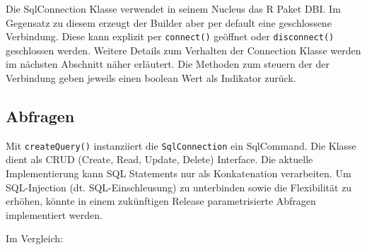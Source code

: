 \documentclass[]{article}
\newenvironment{Shaded}{\begin{snugshade}}{\end{snugshade}}
\newcommand{\CommentTok}[1]{\textcolor[rgb]{0.56,0.35,0.01}{\textit{#1}}}
\newcommand{\DataTypeTok}[1]{\textcolor[rgb]{0.13,0.29,0.53}{#1}}
\newcommand{\KeywordTok}[1]{\textcolor[rgb]{0.13,0.29,0.53}{\textbf{#1}}}
\newcommand{\NormalTok}[1]{#1}
\newcommand{\OperatorTok}[1]{\textcolor[rgb]{0.81,0.36,0.00}{\textbf{#1}}}
\newcommand{\StringTok}[1]{\textcolor[rgb]{0.31,0.60,0.02}{#1}}
\begin{document}
Die SqlConnection Klasse verwendet in seinem Nucleus das R Paket DBI. Im
Gegensatz zu diesem erzeugt der Builder aber per default eine
geschlossene Verbindung. Diese kann explizit per \texttt{connect()}
geöffnet oder \texttt{disconnect()} geschlossen werden. Weitere Details
zum Verhalten der Connection Klasse werden im nächsten Abschnitt näher
erläutert. Die Methoden zum steuern der der Verbindung geben jeweils
einen boolean Wert als Indikator zurück.

\hypertarget{abfragen}{%
\subsection{Abfragen}\label{abfragen}}

\begin{Shaded}
\end{Shaded}

Mit \texttt{createQuery()} instanziiert die \texttt{SqlConnection} ein
SqlCommand. Die Klasse dient als CRUD (Create, Read, Update, Delete)
Interface. Die aktuelle Implementierung kann SQL Statements nur als
Konkatenation verarbeiten. Um SQL-Injection (dt. SQL-Einschleusung) zu
unterbinden sowie die Flexibilität zu erhöhen, könnte in einem
zukünftigen Release parametrisierte Abfragen implementiert werden.

Im Vergleich:
\end{document}
